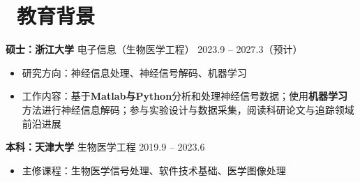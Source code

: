 \section{\makebox[\widthof{\faGraduationCap}][c]{\color{CVBlue}\faGraduationCap}\ 教育背景}
\textbf{硕士：浙江大学} \quad 电子信息（生物医学工程） \hfill 2023.9 -- 2027.3（预计）

\begin{itemize}[nosep]
    \item 研究方向：神经信息处理、神经信号解码、机器学习
    \item 工作内容：基于\textbf{Matlab与Python}分析和处理神经信号数据；使用\textbf{机器学习}方法进行神经信息解码；参与实验设计与数据采集，阅读科研论文与追踪领域前沿进展
\end{itemize}

\textbf{本科：天津大学} \quad 生物医学工程  \hfill 2019.9 -- 2023.6
\begin{itemize}[nosep]
    \item 主修课程：生物医学信号处理、软件技术基础、医学图像处理
\end{itemize}
